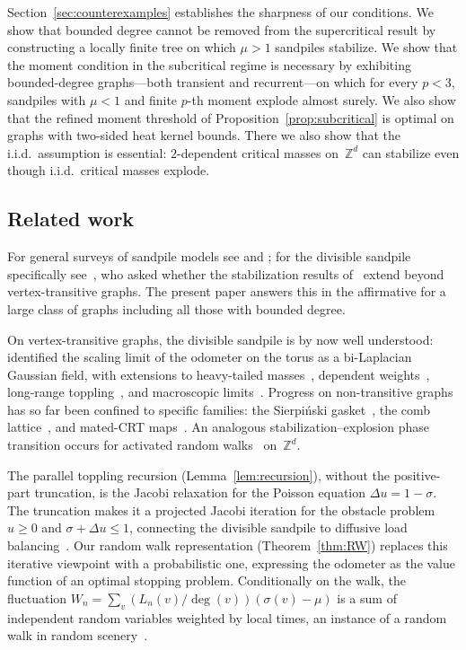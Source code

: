 \documentclass[11pt]{amsart}
\theoremstyle{plain}
\theoremstyle{definition}
\newcommand{\Z}{\mathbb{Z}}
\begin{document}
	Section~\ref{sec:counterexamples} establishes the sharpness of our conditions. We show that bounded degree cannot be removed from the supercritical result by constructing a locally finite tree on which $\mu>1$ sandpiles stabilize. We show that the moment condition in the subcritical regime is necessary by exhibiting bounded-degree graphs---both transient and recurrent---on which for every $p<3$, sandpiles with $\mu<1$ and finite $p$-th moment explode almost surely. We also show that the refined moment threshold of Proposition~\ref{prop:subcritical} is optimal on graphs with two-sided heat kernel bounds. There we also show that the i.i.d.\ assumption is essential: $2$-dependent critical masses on~$\Z^d$ can stabilize even though i.i.d.\ critical masses explode.
	
	\subsection{Related work}
	For general surveys of sandpile models see \citet{Jarai18} and \citet{LP17}; for the divisible sandpile specifically see~\citet{survey-ruszel-div-sandpile}, who asked whether the stabilization results of~\citet{div-sand-crit} extend beyond vertex-transitive graphs. The present paper answers this in the affirmative for a large class of graphs including all those with bounded degree.
	
	On vertex-transitive graphs, the divisible sandpile is by now well understood: \citet*{MR3877548} identified the scaling limit of the odometer on the torus as a bi-Laplacian Gaussian field, with extensions to heavy-tailed masses~\citep{MR3834853}, dependent weights~\citep{CdGR20}, long-range toppling~\citep{MR3796366, MR4282689}, and macroscopic limits~\citep{BouRabee-abelian-sandpile}. Progress on non-transitive graphs has so far been confined to specific families: the Sierpi\'nski gasket~\citep{MR3957187, KaiserSH}, the comb lattice~\citep{HussSava12}, and mated-CRT maps~\citep{BouRabeeGwynne-IDLA, BouRabeeGwynne-harmonic}. An analogous stabilization--explosion phase transition occurs for activated random walks~\citep{RollaSidoravicius12, SidoraviciusTeixeira17, johnson2025odometer} on~$\Z^d$.
	
	The parallel toppling recursion (Lemma~\ref{lem:recursion}), without the positive-part truncation, is the Jacobi relaxation for the Poisson equation $\Delta u = 1 - \sigma$. The truncation makes it a projected Jacobi iteration for the obstacle problem $u \geq 0$ and $\sigma + \Delta u \leq 1$, connecting the divisible sandpile to diffusive load balancing~\citep{Cybenko89, RSW}. Our random walk representation (Theorem~\ref{thm:RW}) replaces this iterative viewpoint with a probabilistic one, expressing the odometer as the value function of an optimal stopping problem. Conditionally on the walk, the fluctuation $W_n = \sum_v (L_n(v)/\deg(v))(\sigma(v)-\mu)$ is a sum of independent random variables weighted by local times, an instance of a random walk in random scenery~\citep{KestenSpitzer79}.
	
\end{document}
